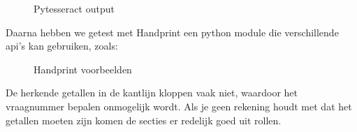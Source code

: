 \documentclass[12pt]{article}
\begin{document}
\begin{multicols}{2}
\begin{figure}[H]
    \caption{Pytesseract output}\label{fig:pytesseract-output}
\end{figure}
Daarna hebben we getest met Handprint een python module die verschillende api's kan gebruiken, zoals:
\begin{figure}[H]%
    \centering
    \qquad
    \caption{Handprint voorbeelden}\label{fig:example}%
\end{figure}
De herkende getallen in de kantlijn kloppen vaak niet, waardoor het vraagnummer bepalen onmogelijk wordt. Als je geen rekening houdt met dat het getallen moeten zijn komen de secties er redelijk goed uit rollen.

\end{multicols}
\end{document}

